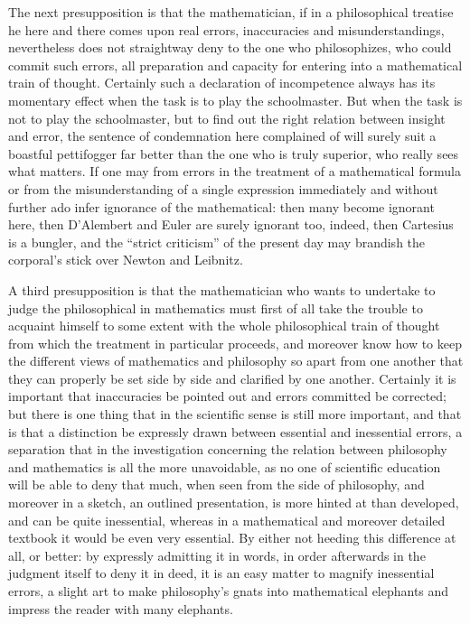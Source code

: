 \documentclass[12pt,a4paper,openany]{book}
\newcommand{\opage}[1]{\marginnote{\footnotesize\textit{[#1]}}}
\begin{document}
The next presupposition is that the mathematician, if
in a philosophical treatise he here and there comes upon real
errors, inaccuracies and misunderstandings, nevertheless does not
straightway deny to the one who philosophizes, who could commit
such errors, all preparation and capacity for entering
into a mathematical train of thought. Certainly such
a declaration of incompetence always has its momentary effect when
the task is to play the schoolmaster. But when the task is not
to play the schoolmaster, but to find out the right relation between
insight and error, the sentence of condemnation here complained of
will surely suit a boastful pettifogger far better than
the one who is truly superior, who really sees what
matters. If one may from errors in the treatment of a
\opage{VI}mathematical formula or from the misunderstanding of a single
expression immediately and without further ado infer ignorance of the
mathematical: then many become ignorant here, then D'Alembert
and Euler are surely ignorant too, indeed, then Cartesius is a
bungler, and the ``strict criticism'' of the present day may brandish the corporal's stick
over Newton and Leibnitz.

A third presupposition is that the mathematician who
wants to undertake to judge the philosophical in mathematics
must first of all take the trouble to acquaint himself
to some extent with the whole philosophical train of thought from which
the treatment in particular proceeds, and moreover know how to keep
the different views of mathematics and philosophy
so apart from one another that they can properly be
set side by side and clarified by one another. Certainly it is
important that inaccuracies be pointed out and errors committed
be corrected; but there is one thing that in the scientific sense is
still more important, and that is that a distinction be expressly drawn between
essential and inessential errors, a separation that in
the investigation concerning the relation between philosophy and
mathematics is all the more unavoidable, as no one of scientific
education will be able to deny that much, when
seen from the side of philosophy, and moreover in a sketch, an
outlined presentation, is more hinted at than developed, and can be
quite inessential, whereas in a mathematical and moreover
detailed textbook it would be even very essential. By
either not heeding this difference at all, or better: by
expressly admitting it in words, in order afterwards in the judgment
itself to deny it in deed, it is an easy
matter to magnify inessential errors, a slight art to make
philosophy's gnats into mathematical elephants and impress
the reader with many elephants.
\end{document}
